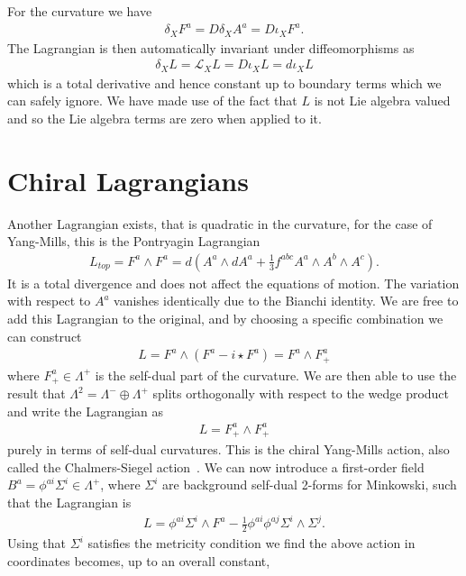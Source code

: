 \documentclass[10pt]{report}
\theoremstyle{definition}
\begin{document}
For the curvature we have 
\begin{align}
    \delta_X F^a = D \delta_X A^a = D \iota_X F^a.
\end{align}
The Lagrangian is then automatically invariant under diffeomorphisms as
\begin{align}
    \delta_X L = \mathcal{L}_X L = D \iota_X L = d \iota_X L
\end{align}
which is a total derivative and hence constant up to boundary terms which we can safely ignore. We have made use of the fact that $L$ is not Lie algebra valued and so the Lie algebra terms are zero when applied to it.

\section{Chiral Lagrangians}\label{sec:chiral-yang-mills-lagrangians}
Another Lagrangian exists, that is quadratic in the curvature, for the case of Yang-Mills, this is the Pontryagin Lagrangian
\begin{align}
    L_{top} = F^a \wedge F^a = d(A^a \wedge dA^a + \frac{1}{3} f^{abc} A^a \wedge A^b \wedge A^c).
\end{align}
It is a total divergence and does not affect the equations of motion. The variation with respect to $A^a$ vanishes identically due to the Bianchi identity. We are free to add this Lagrangian to the original, and by choosing a specific combination we can construct 
\begin{align}
    L = F^a \wedge (F^a - i \star F^a) = F^a \wedge F^a_+
\end{align}
where $F^a_+ \in \Lambda^+$ is the self-dual part of the curvature. We are then able to use the result that $\Lambda^2 = \Lambda^-\oplus \Lambda^+$ splits orthogonally with respect to the wedge product and write the Lagrangian as 
\begin{align}
    L = F^a_+ \wedge F^a_+
\end{align}
purely in terms of self-dual curvatures. This is the chiral Yang-Mills action, also called the Chalmers-Siegel action~\cite{The_self_dual_s_Chalme_1996}.  We can now introduce a first-order field $B^a = \phi^{ai} \Sigma^i \in \Lambda^+$, where $\Sigma^i$ are background self-dual 2-forms for Minkowski, such that the Lagrangian is 
\begin{align}
    L = \phi^{ai} \Sigma^i \wedge F^a - \frac{1}{2} \phi^{ai} \phi^{aj} \Sigma^i \wedge \Sigma^j. \label{eq:chiral-YM-action}
\end{align}
Using that $\Sigma^i$ satisfies the metricity condition we find the above action in coordinates becomes, up to an overall constant,
\end{document}

